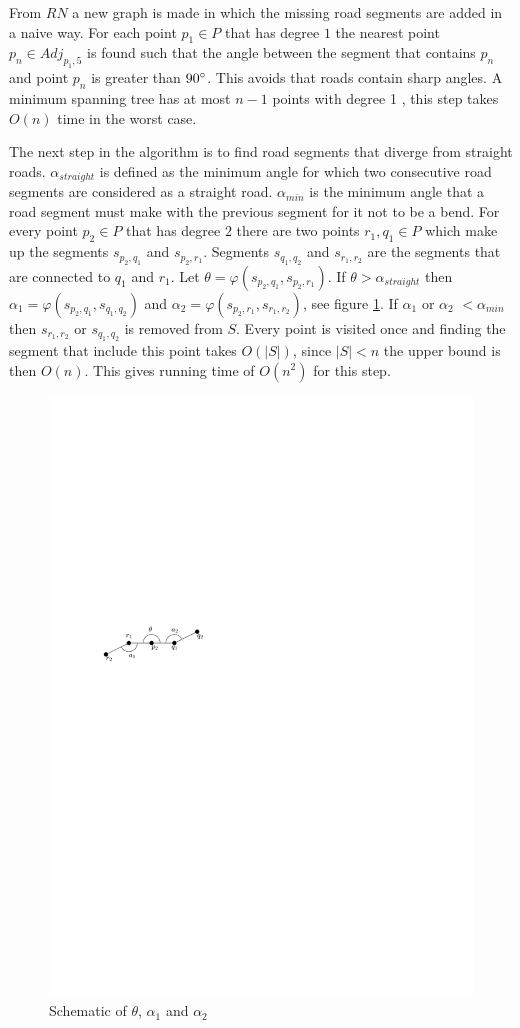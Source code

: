 \documentclass[11pt]{article}
\begin{document}
From $RN$ a new graph is made in which the missing road segments are added in a naive way. For each point $p_1 \in P$ that has degree $1$ the nearest point $p_n \in Adj_{p_1,5}$ is found such that the angle between the segment that contains $p_n$ and point $p_n$ is greater than $90\degree$. This avoids that roads contain sharp angles. A minimum spanning tree has at most $n-1$ points with degree 1 \cite{clrs-ia-09}, this step takes $O(n)$ time in the worst case. 

The next step in the algorithm is to find road segments that diverge from straight roads. $\alpha_{straight}$ is defined as the minimum angle for which two consecutive road segments are considered as a straight road. $\alpha_{min}$ is the minimum angle that a road segment must make with the previous segment for it not to be a bend. For every point $p_2 \in P$ that has degree $2$ there are two points $r_1, q_1 \in P$ which make up the segments $s_{p_2, q_1}$ and $s_{p_2,r_1}$. Segments $s_{q_1, q_2}$ and $s_{r_1,r_2}$ are the segments that are connected to $q_1$ and $r_1$. Let $\theta=\varphi(s_{p_2, q_1},s_{p_2,r_1})$. If $\theta> \alpha_{straight}$ then $\alpha_1=\varphi(s_{p_2, q_1},s_{q_1, q_2})$ and $\alpha_2=\varphi(s_{p_2, r_1},s_{r_1, r_2})$, see figure \ref{networkremove}. If $\alpha_1$ or $\alpha_2$ $<\alpha_{min}$ then $s_{r_1, r_2}$ or $s_{q_1, q_2}$ is removed from $S$. Every point is visited once and finding the segment that include this point takes $O(|S|)$, since $|S|<n$ the upper bound is then $O(n)$. This gives running time of $O(n^2)$ for this step.

\begin{figure}[h]
\centering
  \graphicspath{ {images/}}
  \includegraphics[width=0.5\linewidth]{NetworkRemoveSegmentsDetail}
  \caption{Schematic of $\theta$, $\alpha_1$ and $\alpha_2$}
  \label{networkremove}
\end{figure}
  
\end{document}
